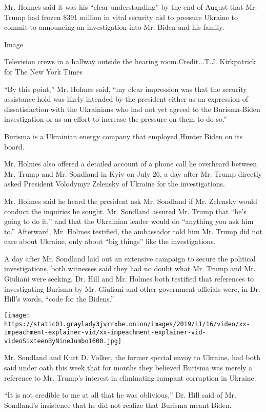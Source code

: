 Mr. Holmes said it was his ``clear understanding'' by the end of August
that Mr. Trump had frozen \$391 million in vital security aid to
pressure Ukraine to commit to announcing an investigation into Mr. Biden
and his family.

Image

Television crews in a hallway outside the hearing room.Credit...T.J.
Kirkpatrick for The New York Times

``By this point,'' Mr. Holmes said, ``my clear impression was that the
security assistance hold was likely intended by the president either as
an expression of dissatisfaction with the Ukrainians who had not yet
agreed to the Burisma-Biden investigation or as an effort to increase
the pressure on them to do so.''

Burisma is a Ukrainian energy company that employed Hunter Biden on its
board.

Mr. Holmes also offered a detailed account of a phone call he overheard
between Mr. Trump and Mr. Sondland in Kyiv on July 26, a day after Mr.
Trump directly asked President Volodymyr Zelensky of Ukraine for the
investigations.

Mr. Holmes said he heard the president ask Mr. Sondland if Mr. Zelensky
would conduct the inquiries he sought. Mr. Sondland assured Mr. Trump
that ``he's going to do it,'' and that the Ukrainian leader would do
``anything you ask him to.'' Afterward, Mr. Holmes testified, the
ambassador told him Mr. Trump did not care about Ukraine, only about
``big things'' like the investigations.

A day after Mr. Sondland laid out an extensive campaign to secure the
political investigations, both witnesses said they had no doubt what Mr.
Trump and Mr. Giuliani were seeking. Dr. Hill and Mr. Holmes both
testified that references to investigating Burisma by Mr. Giuliani and
other government officials were, in Dr. Hill's words, ``code for the
Bidens.''

\texttt{[image: https://static01.graylady3jvrrxbe.onion/images/2019/11/16/video/xx-impeachment-explainer-vid/xx-impeachment-explainer-vid-videoSixteenByNineJumbo1600.jpg]}

Mr. Sondland and Kurt D. Volker, the former special envoy to Ukraine,
had both said under oath this week that for months they believed Burisma
was merely a reference to Mr. Trump's interest in eliminating rampant
corruption in Ukraine.

``It is not credible to me at all that he was oblivious,'' Dr. Hill said
of Mr. Sondland's insistence that he did not realize that Burisma meant
Biden.

